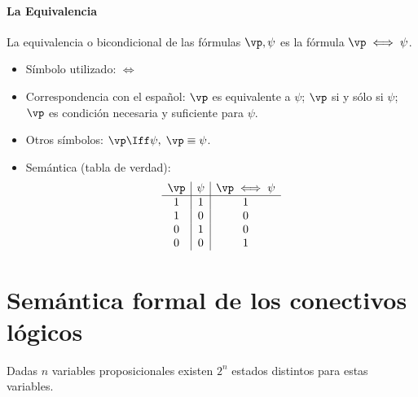 \documentclass[11pt,letterpaper]{article}
\begin{document}
\paragraph{La Equivalencia}
La equivalencia o bicondicional de las f\'ormulas $\vp,\psi$ es la f\'ormula
$\vp\iff \psi$. 

\begin{itemize}
 \item S\'imbolo utilizado: $\iff$
 \item Correspondencia con el espa\~nol: $\vp$ es equivalente a $\psi$; 
  $\vp$ si y s\'olo si $\psi$; $\vp$ es condici\'on necesaria y suficiente 
  para $\psi$.
 \item Otros s\'imbolos: $\vp\Iff \psi,\;\vp\equiv \psi$.
 \item Sem\'antica (tabla de verdad): 
  \[
   \begin{array}{c|c|c}
    \vp & \psi & \vp\iff \psi\\ \hline 
    1 & 1 & 1\\
    1 & 0 & 0\\
    0 & 1 & 0\\
    0 & 0 & 1\\
   \end{array}
  \]
\end{itemize}

\section{Sem\'antica formal de los conectivos l\'ogicos}



\noindent Dadas $n$ variables proposicionales existen $2^n$ estados distintos
para estas variables.

\end{document}
